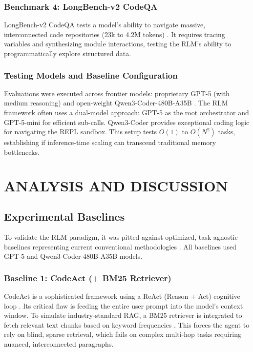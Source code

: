 \subsection{Benchmark 4: LongBench-v2 CodeQA}
LongBench-v2 CodeQA tests a model's ability to navigate massive, interconnected code repositories (23k to 4.2M tokens) \cite{bai2025}. It requires tracing variables and synthesizing module interactions, testing the RLM's ability to programmatically explore structured data.



\subsection{Testing Models and Baseline Configuration}
Evaluations were executed across frontier models: proprietary GPT-5 (with medium reasoning) and open-weight Qwen3-Coder-480B-A35B \cite{openai2025, qwen2025}. The RLM framework often uses a dual-model approach: GPT-5 as the root orchestrator and GPT-5-mini for efficient sub-calls. Qwen3-Coder provides exceptional coding logic for navigating the REPL sandbox. This setup tests $O(1)$ to $O(N^2)$ tasks, establishing if inference-time scaling can transcend traditional memory bottlenecks.

\chapter{ANALYSIS AND DISCUSSION}


\section{Experimental Baselines}
To validate the RLM paradigm, it was pitted against optimized, task-agnostic baselines representing current conventional methodologies \cite{yao2023, wang2024, wu2025}. All baselines used GPT-5 and Qwen3-Coder-480B-A35B models.

\subsection{Baseline 1: CodeAct (+ BM25 Retriever)}
CodeAct is a sophisticated framework using a ReAct (Reason + Act) cognitive loop \cite{yao2023, wang2024}. Its critical flaw is feeding the entire user prompt into the model's context window. To simulate industry-standard RAG, a BM25 retriever is integrated to fetch relevant text chunks based on keyword frequencies \cite{robertson2009}. This forces the agent to rely on blind, sparse retrieval, which fails on complex multi-hop tasks requiring nuanced, interconnected paragraphs.


